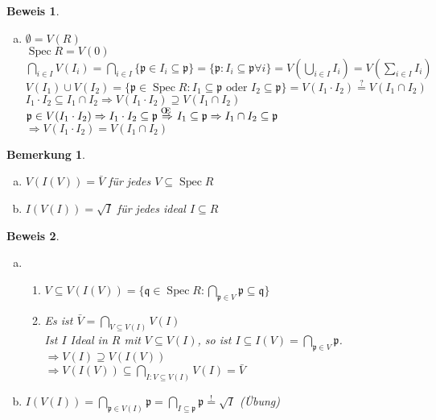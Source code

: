 \documentclass[a4paper,12pt]{report}
\theoremstyle{break}
\newtheorem{Bem}[Def]{Bemerkung}
\theoremstyle{nonumberbreak}
\newtheorem{bew}{Beweis}
\theoremstyle{nonumberplain}
\newcommand{\quot}[1]{\textrm{\glqq}{#1}\textrm{\grqq}}
\newenvironment{twosidedproof}{\begin{enumerate}[\quot{$\Rightarrow$}:]}{\end{enumerate}}
\newcommand{\proofsubseteq}{\item[\quot{$\subseteq$}:]}
\newcommand{\proofsupseteq}{\item[\quot{$\supseteq$}:]}
\DeclareMathOperator{\Spec}{Spec}
\newcommand{\p}{\mathfrak{p}}
\newcommand{\q}{\mathfrak{q}}
\renewcommand{\OE}{O\!\!E~}
\begin{document}
\begin{bew}\begin{enumerate}[a)]\item[c)]
$\emptyset = V(R)$\\
$\Spec R = V(0)$\\
$\bigcap\limits_{i\in I} V(I_i) = \bigcap\limits_{i\in I}\{\p \in I_i \subseteq \p\} = \{\p: I_i \subseteq \p \forall i\} = V(\bigcup\limits_{i\in I} I_i) = V(\sum\limits_{i\in I} I_i)$\\
$V(I_1)\cup V(I_2) = \{\p \in \Spec R: I_1 \subseteq \p \text{ oder } I_2 \subseteq \p\} = V(I_1\cdot I_2) \overset{?}{=} V(I_1\cap I_2)$\\
\hspace*{10mm} $I_1\cdot I_2 \subseteq I_1 \cap I_2 \Rightarrow V(I_1\cdot I_2) \supseteq V(I_1\cap I_2)$\\
\hspace*{10mm} $\p \in V(I_1\cdot I_2) \Rightarrow I_1\cdot I_2 \subseteq \p \overset{\text{\OE}}{\Rightarrow} I_1 \subseteq \p \Rightarrow I_1\cap I_2 \subseteq \p$\\
$\Rightarrow V(I_1\cdot I_2) = V(I_1\cap I_2)$
\end{enumerate}\end{bew}

\begin{Bem}\begin{enumerate}[a)]
\item
  $V(I(V)) = \bar{V}$ f\"ur jedes $V\subseteq \Spec R$
\item
  $I(V(I)) = \sqrt{I}$ f\"ur jedes ideal $I\subseteq R$
\end{enumerate}\end{Bem}

\begin{bew}\begin{enumerate}[a)]
\item
  \begin{twosidedproof}
  \proofsupseteq
    $V\subseteq V(I(V)) = \{\q \in \Spec R: \bigcap\limits_{\p \in V} \p \subseteq \q \}$
  \proofsubseteq
    Es ist $\bar{V} = \bigcap\limits_{V\subseteq V(I)}V(I)$\\
    Ist $I$ Ideal in $R$ mit $V\subseteq V(I)$, so ist $I\subseteq I(V) = \bigcap\limits_{\p \in V} \p$.\\
    $\Rightarrow V(I) \supseteq V(I(V))$\\
    $\Rightarrow V(I(V)) \subseteq \bigcap\limits_{I:V\subseteq V(I)} V(I) = \bar{V}$
  \end{twosidedproof}
\item
  $I(V(I)) = \bigcap\limits_{\p \in V(I)} \p = \bigcap\limits_{I\subseteq \p} \p \overset{!}{=} \sqrt{I}$ (\"Ubung)
\end{enumerate}\end{bew}
\end{document}
